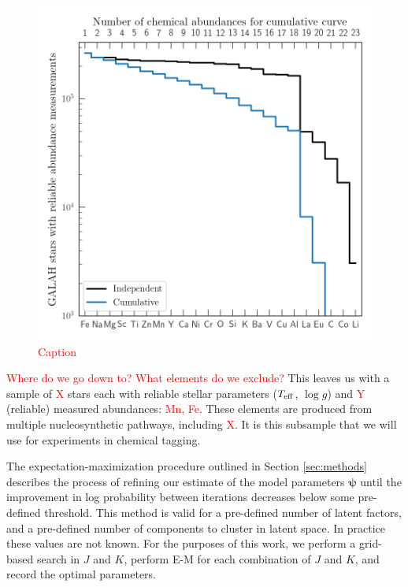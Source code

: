 \documentclass[twocolumn]{aastex61}
\newcommand\teff{T_{\rm eff}}
\newcommand\logg{\log{g}}
\newcommand{\todo}[1]{\textcolor{red}{#1}}
\newcommand{\vect}[1]{\boldsymbol{\mathbf{#1}}}
\renewcommand{\vec}[1]{\vect{#1}}
\begin{document}
\begin{figure}
	\includegraphics[width=1.0\textwidth]{experiments/galah-abundances.png}
    \caption{\todo{Caption}}
    \label{fig:galah-abundances}
\end{figure}


\todo{Where do we go down to? What elements do we exclude?}
This leaves us with a sample of \todo{X} stars each with
reliable stellar parameters ($\teff$, $\logg$) and 
\todo{Y} (reliable) measured abundances: \todo{Mn, Fe}.
These elements are produced from multiple nucleosynthetic
pathways, including \todo{X}. 
It is this subsample that we will use for experiments
in chemical tagging.


The expectation-maximization procedure outlined in Section \ref{sec:methods} describes 
the process of refining our estimate of the model parameters $\vec\psi$ until
the improvement in log probability between iterations decreases below some
pre-defined threshold. This method is valid for a pre-defined number of latent
factors, and a pre-defined number of components to cluster in latent space.
In practice these values are not known. For the purposes of this work, we 
perform a grid-based search in $J$ and $K$, perform E-M for each combination of
$J$ and $K$, and record the optimal parameters.
\end{document}
